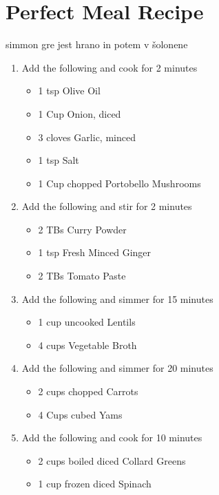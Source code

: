 \documentclass[a4paper,12pt]{book}
\begin{document}
 
 
 
 
 
 
 
 
 
 
 
\section{Perfect Meal Recipe}
 simmon gre jest hrano in potem v šolonene 
 
 
\begin{enumerate}[label=\Roman*, font=\bfseries]
	\item Add the following and cook for 2 minutes
	\begin{itemize}
		\item 1 tsp Olive Oil
		\item 1 Cup Onion, diced
		\item 3 cloves Garlic, minced
		\item 1 tsp Salt
		\item 1 Cup chopped Portobello Mushrooms
	\end{itemize}
	\item Add the following and stir for 2 minutes
	\begin{itemize}
		\item 2 TBs Curry Powder
		\item 1 tsp Fresh Minced Ginger
		\item 2 TBs Tomato Paste
	\end{itemize}
	\item Add the following and simmer for 15 minutes
	\begin{itemize}
		\item 1 cup uncooked Lentils
		\item 4 cups Vegetable Broth
	\end{itemize}
	\item Add the following and simmer for 20 minutes
	\begin{itemize}
		\item 2 cups chopped Carrots
		\item 4 Cups cubed Yams
	\end{itemize}
	\item Add the following and cook for 10 minutes
	\begin{itemize}
		\item 2 cups boiled diced Collard Greens
		\item 1 cup frozen diced Spinach
	\end{itemize}
\end{enumerate}
 
\end{document}
